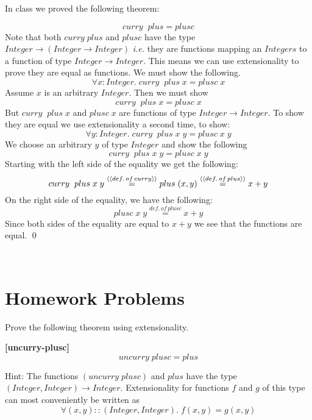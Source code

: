 \documentclass[11pt]{article}
\begin{document}
In class we proved the following theorem:

\begin{theorem}{}
\[curry\;\; plus = plusc\]
\Proof Note that both $curry\;plus$ and $plusc$ have the type
$Integer\rightarrow (Integer \rightarrow Integer)$ {\em{i.e.}} they are
functions mapping an $Integers$ to a function of type
$Integer\rightarrow{}Integer$.  This means we can use extensionality to prove
they are equal as functions.  We must show the following.
\[\forall{}x:Integer.\; curry\;\; plus\; x = plusc\; x\]
Assume $x$ is an arbitrary $Integer$. Then we must show
\[curry\;\; plus\; x = plusc\; x\]
But $curry\;\; plus \; x$ and $plusc\; x$ are functions of type
$Integer\rightarrow{}Integer$. To show they are equal we use extensionality a
second time, to show:
\[\forall{}y:Integer.\; curry\;\; plus\; x\; y = plusc\; x\; y\]
We choose an arbitrary $y$ of type $Integer$ and  show the following
\[curry\;\; plus\; x\; y = plusc\; x\; y\]
Starting with the left side of the equality we get the following:
\[curry\;\; plus\; x\; y \stackrel{{\langle{{\langle{def.\,of\, curry}\rangle}}\rangle}}{=} plus\; (x,y)   \stackrel{{\langle{{\langle{def.\,of\, plus}\rangle}}\rangle}}{=} x + y \]
On the right side of the equality, we have the following:
\[plusc\; x\; y \stackrel{def.\,of\, plusc}{=} x + y \]
Since both sides of the equality are equal to $x+y$ we see that the functions
are equal.  \qed
\end{theorem}
\ \\

\section{Homework Problems}
\begin{problem}
Prove the following theorem using extensionality.

\begin{theorem}{\bf{[uncurry-plusc]}} 
\[uncurry\;plusc = plus \]
\end{theorem}

Hint: The functions $(uncurry\;plusc)$ and $plus$ have the type
$(Integer,Integer)\rightarrow{}Integer$.  Extensionality for functions $f$ and
$g$ of this type can most conveniently  be written as
\[\forall{}(x,y)::(Integer,Integer).\; f (x,y) = g (x,y)\]


\end{problem}
\end{document}
